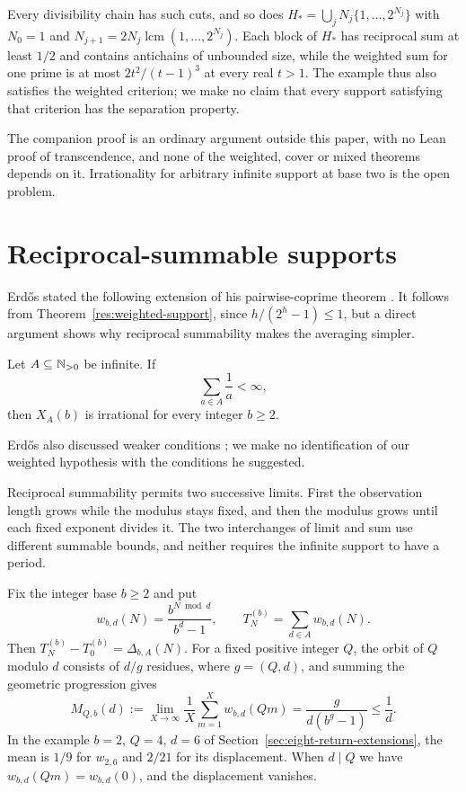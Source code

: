 \documentclass[11pt]{article}
\begin{document}
Every divisibility chain has such cuts, and so does
$H_* = \bigcup_j N_j\{1,\ldots,2^{N_j}\}$ with $N_0=1$ and
$N_{j+1}=2N_j\operatorname{lcm}(1,\ldots,2^{N_j})$. Each block of
$H_*$ has reciprocal sum at least $1/2$ and contains antichains of
unbounded size, while the weighted sum for one prime is at most
$2t^2/(t-1)^3$ at every real $t>1$. The example thus also satisfies
the weighted criterion; we make no claim that every support satisfying
that criterion has the separation property.

The companion proof is an ordinary argument outside this paper, with no
Lean proof of transcendence, and none of the weighted, cover or mixed
theorems depends on it. Irrationality for arbitrary infinite support at
base two is the open problem.

\appendix
\section{Reciprocal-summable supports}\label{sec:reciprocal-support}
Erd\H{o}s stated the following extension of his pairwise-coprime
theorem \cite[p.~222]{erdos1968}. It follows from
Theorem~\ref{res:weighted-support}, since $h/(2^h-1)\le1$, but a direct
argument shows why reciprocal summability makes the averaging simpler.

\begin{theorem}\label{res:reciprocal-support}
Let $A\subseteq\mathbb{N}_{>0}$ be infinite.  If
\[
  \sum_{a\in A}\frac1a<\infty,
\]
then \(X_A(b)\) is irrational for every integer \(b\ge2\).
\end{theorem}

Erd\H{o}s also discussed weaker conditions \cite[pp.~222, 226]{erdos1968};
we make no identification of our weighted hypothesis with the conditions
he suggested.

Reciprocal summability permits two successive limits. First the
observation length grows while the modulus stays fixed, and then the
modulus grows until each fixed exponent divides it. The two
interchanges of limit and sum use different summable bounds, and
neither requires the infinite support to have a period.

Fix the integer base $b\ge2$ and put
\[
 w_{b,d}(N)=\frac{b^{N\bmod d}}{b^d-1},\qquad
 T_N^{(b)}=\sum_{d\in A}w_{b,d}(N).
\]
Then $T_N^{(b)}-T_0^{(b)}=\Delta_{b,A}(N)$. For a fixed positive
integer $Q$, the orbit of $Q$ modulo $d$ consists of $d/g$ residues,
where $g=(Q,d)$, and summing the geometric progression gives
\begin{equation}
 M_{Q,b}(d):=\lim_{X\to\infty}\frac1X\sum_{m=1}^Xw_{b,d}(Qm)
 =\frac{g}{d(b^g-1)}\le\frac1d.
 \label{eq:gcd-orbit-mean}
\end{equation}
In the example $b=2$, $Q=4$, $d=6$ of
Section~\ref{sec:eight-return-extensions}, the mean is $1/9$ for
$w_{2,6}$ and $2/21$ for its displacement. When $d\mid Q$ we have
$w_{b,d}(Qm)=w_{b,d}(0)$, and the displacement vanishes.
\end{document}
